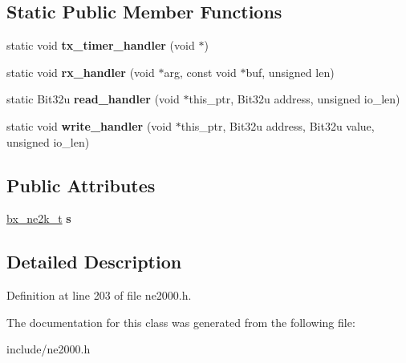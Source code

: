 \subsection*{Static Public Member Functions}
\begin{DoxyCompactItemize}
\item 
\hypertarget{classbx__ne2k__c_a096b6d391193d92950820c928bfc9d2b}{static void {\bfseries tx\-\_\-timer\-\_\-handler} (void $\ast$)}\label{classbx__ne2k__c_a096b6d391193d92950820c928bfc9d2b}

\item 
\hypertarget{classbx__ne2k__c_a99b4d7ac6e2e072e1d5b5ba762eede3d}{static void {\bfseries rx\-\_\-handler} (void $\ast$arg, const void $\ast$buf, unsigned len)}\label{classbx__ne2k__c_a99b4d7ac6e2e072e1d5b5ba762eede3d}

\item 
\hypertarget{classbx__ne2k__c_a3576daab1d71db4fc5f067d4a81dff6f}{static Bit32u {\bfseries read\-\_\-handler} (void $\ast$this\-\_\-ptr, Bit32u address, unsigned io\-\_\-len)}\label{classbx__ne2k__c_a3576daab1d71db4fc5f067d4a81dff6f}

\item 
\hypertarget{classbx__ne2k__c_a9f56ef73311b2366b135c3edacf048fc}{static void {\bfseries write\-\_\-handler} (void $\ast$this\-\_\-ptr, Bit32u address, Bit32u value, unsigned io\-\_\-len)}\label{classbx__ne2k__c_a9f56ef73311b2366b135c3edacf048fc}

\end{DoxyCompactItemize}
\subsection*{Public Attributes}
\begin{DoxyCompactItemize}
\item 
\hypertarget{classbx__ne2k__c_af542f5a2962236245c66a3a7c11612a7}{\hyperlink{structbx__ne2k__t}{bx\-\_\-ne2k\-\_\-t} {\bfseries s}}\label{classbx__ne2k__c_af542f5a2962236245c66a3a7c11612a7}

\end{DoxyCompactItemize}


\subsection{Detailed Description}


Definition at line 203 of file ne2000.\-h.



The documentation for this class was generated from the following file\-:\begin{DoxyCompactItemize}
\item 
include/ne2000.\-h\end{DoxyCompactItemize}
